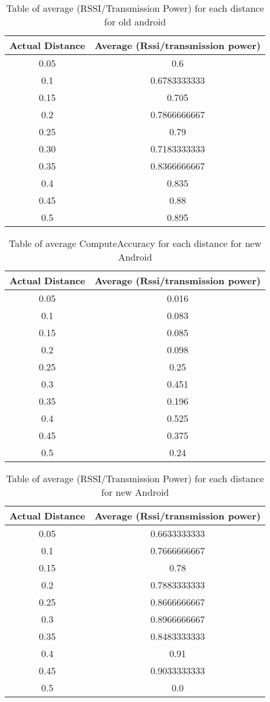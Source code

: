 \begin{table}[H]
\label{tableOfRSSIOldAndroid}
\begin{tabular}{|c|c|}
\hline 
Actual Distance & Average (Rssi/transmission power)\tabularnewline
\hline 
\hline 
0.05 & 0.6\tabularnewline
\hline 
0.1 & 0.6783333333\tabularnewline
\hline 
0.15 & 0.705\tabularnewline
\hline 
0.2 & 0.7866666667\tabularnewline
\hline 
0.25 & 0.79\tabularnewline
\hline 
0.30 & 0.7183333333\tabularnewline
\hline 
0.35 & 0.8366666667\tabularnewline
\hline 
0.4 & 0.835\tabularnewline
\hline 
0.45 & 0.88\tabularnewline
\hline 
0.5 & 0.895\tabularnewline
\hline 
\end{tabular}

\protect\caption{Table of average (RSSI/Transmission Power) for each distance for old android}
\end{table}



\begin{table}[H]
\label{tableOfComputeAccuracyNewAndroid}
\begin{tabular}{|c|c|}
\hline 
Actual Distance & Average (Rssi/transmission power)\tabularnewline
\hline 
\hline 
0.05 & 0.016\tabularnewline
\hline 
0.1 & 0.083\tabularnewline
\hline 
0.15 & 0.085\tabularnewline
\hline 
0.2 & 0.098\tabularnewline
\hline 
0.25 & 0.25\tabularnewline
\hline 
0.3 & 0.451\tabularnewline
\hline 
0.35 & 0.196\tabularnewline
\hline 
0.4 & 0.525\tabularnewline
\hline 
0.45 & 0.375\tabularnewline
\hline 
0.5 & 0.24\tabularnewline
\hline 
\end{tabular}

\protect\caption{Table of average ComputeAccuracy for each distance for new Android}
\end{table}

\begin{table}[H]
\label{tableOfRssiNewAndroid}
\begin{tabular}{|c|c|}
\hline 
Actual Distance & Average (Rssi/transmission power)\tabularnewline
\hline 
\hline 
0.05 & 0.6633333333\tabularnewline
\hline 
0.1 & 0.7666666667\tabularnewline
\hline 
0.15 & 0.78\tabularnewline
\hline 
0.2 & 0.7883333333\tabularnewline
\hline 
0.25 & 0.8666666667\tabularnewline
\hline 
0.3 & 0.8966666667\tabularnewline
\hline 
0.35 &  0.8483333333\tabularnewline
\hline 
0.4 & 0.91\tabularnewline
\hline 
0.45 & 0.9033333333\tabularnewline
\hline 
0.5 & 0.0\tabularnewline
\hline 
\end{tabular}

\protect\caption{Table of average (RSSI/Transmission Power) for each distance for new Android}
\end{table}